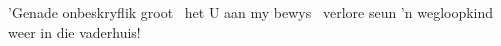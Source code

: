 ’Genade onbeskryflik groot 
het U aan my bewys 
verlore seun ’n wegloopkind 
weer in die vaderhuis! 
